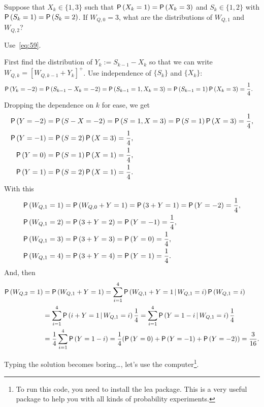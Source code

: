 \begin{extra}
 Suppose that $X_k\in\{1,3\}$ such that $\P{X_k=1}=\P{X_k=3}$ and
 $S_k\in\{1,2\}$ with $\P{S_k=1}=\P{S_k=2}$. If $W_{Q,0}=3$, what are
 the distributions of $W_{Q,1}$ and $W_{Q,2}$? 
\begin{hint}
Use~\cref{eq:59}.
\end{hint}
\begin{solution} First find the distribution of $Y_k:=S_{k-1}-X_k$ so that we can write
 $W_{Q,k}=[W_{Q,k-1}+Y_k]^+$. Use independence of $\{S_k\}$ and $\{X_k\}$:
\begin{align*}
 \P{Y_k=-2} &=\P{S_{k-1}-X_k=-2} = \P{S_{k-1}=1, X_k=3} = \P{S_{k-1}=1}\P{X_k=3} = \frac14.
\end{align*}
Dropping the dependence on $k$ for ease, we get
\begin{align*}
 \P{Y=-2} &=\P{S-X=-2} = \P{S=1, X=3} = \P{S=1}\P{X=3} = \frac14,\\
 \P{Y=-1} &=\P{S=2}\P{X=3} = \frac14,\\
 \P{Y=0} &=\P{S=1}\P{X=1} = \frac14,\\
 \P{Y=1} &=\P{S=2}\P{X=1} = \frac14.
\end{align*}
With this
 \begin{align*}
 \P{W_{Q,1} = 1} &=\P{W_{Q,0} + Y= 1} = \P{3 + Y =1} = \P{Y=-2} =\frac14,\\
 \P{W_{Q,1} = 2} &= \P{3 + Y =2} = \P{Y=-1} =\frac14,\\
 \P{W_{Q,1} = 3} &= \P{3 + Y = 3} = \P{Y=0} =\frac14,\\
 \P{W_{Q,1} = 4} &= \P{3 + Y = 4} = \P{Y=1} =\frac14.\\
 \end{align*}
And, then
 \begin{equation*}
 \begin{split}
 \P{W_{Q,2} = 1} 
&=\P{W_{Q,1} + Y = 1} = \sum_{i=1}^4 \P{W_{Q,1} + Y = 1\given W_{Q,1}=i}\P{W_{Q,1}=i}\\
&=\sum_{i=1}^4 \P{i + Y = 1\given W_{Q,1}=i}\frac14
=\sum_{i=1}^4 \P{Y = 1-i\given W_{Q,1}=i}\frac14\\
&=\frac14\sum_{i=1}^4 \P{Y = 1-i} = \frac14(\P{Y = 0} + \P{Y=-1} +\P{Y=-2}) = \frac{3}{16}.
 \end{split}
 \end{equation*}

Typing the solution becomes boring\ldots, let's use the computer\footnote{To run this code, you need to install the lea package. This is a very useful package to help you with all kinds of probability experiments.}.


\end{solution}
\end{extra}
